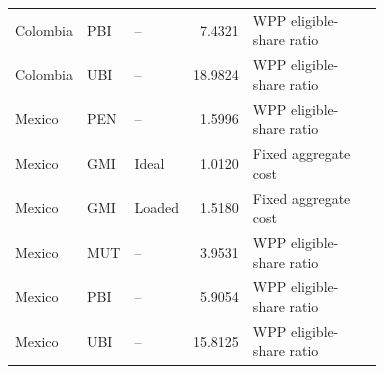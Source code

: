 \begin{longtable}{@{}p{0.12\linewidth}p{0.12\linewidth}p{0.13\linewidth}r p{0.36\linewidth}@{}}
Colombia & PBI & -- & 7.4321 & WPP eligible-share ratio \\
Colombia & UBI & -- & 18.9824 & WPP eligible-share ratio \\
Mexico & PEN & -- & 1.5996 & WPP eligible-share ratio \\
Mexico & GMI & Ideal & 1.0120 & Fixed aggregate cost \\
Mexico & GMI & Loaded & 1.5180 & Fixed aggregate cost \\
Mexico & MUT & -- & 3.9531 & WPP eligible-share ratio \\
Mexico & PBI & -- & 5.9054 & WPP eligible-share ratio \\
Mexico & UBI & -- & 15.8125 & WPP eligible-share ratio \\
\bottomrule
\end{longtable}
\endgroup
